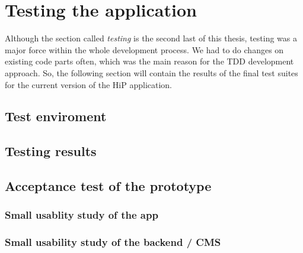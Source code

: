 \chapter[Testing the application]{Testing the application}
Although the section called \textit{testing} is the second last of this thesis, testing was a major force within the whole development process. We had to do changes on existing code parts often, which was the main reason for the \ac{TDD} development approach. So, the following section will contain the results of the final test suites for the current version of the HiP application. %
  
\section{Test enviroment}

\section{Testing results}

\section{Acceptance test of the prototype}

\subsection{Small usablity study of the app}

\subsection{Small usability study of the backend / CMS}

